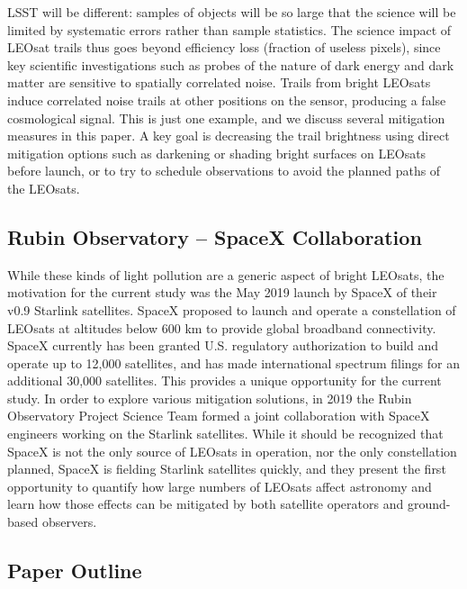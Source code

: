\documentclass[twocolumn,trackchanges]{aastex63}
\begin{document}
LSST will be different: samples of objects will be so large that the science will be limited by systematic errors rather than sample statistics.
The science impact of LEOsat trails thus goes beyond efficiency loss (fraction of useless pixels), since key scientific investigations such as probes of the nature of dark energy and dark matter are sensitive to spatially correlated noise. Trails from bright LEOsats induce correlated noise trails at other positions on the sensor, producing a false cosmological signal. This is just one example, and we discuss several mitigation measures in this paper. A key goal is decreasing the trail brightness using direct mitigation options such as darkening or shading bright surfaces on LEOsats before launch, or to try to schedule observations to avoid the planned paths of the LEOsats.


\subsection{Rubin Observatory -- SpaceX Collaboration} \label{subsec:collab}

While these kinds of light pollution are a generic aspect of bright LEOsats, the motivation for the current study was the May 2019 launch by SpaceX of their v0.9 Starlink satellites.  SpaceX proposed to launch and operate a constellation of LEOsats at altitudes below 600 km to provide global broadband connectivity.  SpaceX currently has been granted U.S. regulatory authorization to build and operate up to 12,000 satellites, and has made international spectrum filings for an additional 30,000 satellites. This provides a unique opportunity for the current study.
In order to explore various mitigation solutions, in 2019 the Rubin Observatory Project Science Team formed a joint collaboration with SpaceX engineers working on the Starlink satellites. While it should be recognized that SpaceX is not the only source of LEOsats in operation, nor the only constellation planned, SpaceX is fielding Starlink satellites quickly, and they present the first opportunity to quantify how large numbers of LEOsats affect astronomy and learn how those effects can be mitigated by both satellite operators and ground-based observers.
 
\subsection{Paper Outline} \label{outline}
\end{document}
